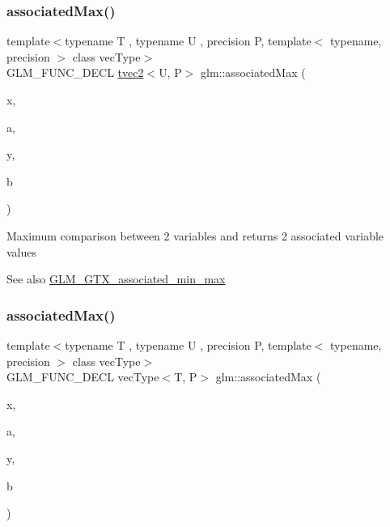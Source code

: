 \subsubsection{\texorpdfstring{associated\+Max()}{associatedMax()}\hspace{0.1cm}{\footnotesize\ttfamily [2/12]}}
{\footnotesize\ttfamily template$<$typename T , typename U , precision P, template$<$ typename, precision $>$ class vec\+Type$>$ \\
G\+L\+M\+\_\+\+F\+U\+N\+C\+\_\+\+D\+E\+CL \hyperlink{structglm_1_1tvec2}{tvec2}$<$U, P$>$ glm\+::associated\+Max (\begin{DoxyParamCaption}\item[{vec\+Type$<$ T, P $>$ const \&}]{x,  }\item[{vec\+Type$<$ U, P $>$ const \&}]{a,  }\item[{vec\+Type$<$ T, P $>$ const \&}]{y,  }\item[{vec\+Type$<$ U, P $>$ const \&}]{b }\end{DoxyParamCaption})}

Maximum comparison between 2 variables and returns 2 associated variable values \begin{DoxySeeAlso}{See also}
\hyperlink{group__gtx__associated__min__max}{G\+L\+M\+\_\+\+G\+T\+X\+\_\+associated\+\_\+min\+\_\+max} 
\end{DoxySeeAlso}
\mbox{\label{group__gtx__associated__min__max_ga62ca63cca6b21387b8a25474f441a869}} 
\subsubsection{\texorpdfstring{associated\+Max()}{associatedMax()}\hspace{0.1cm}{\footnotesize\ttfamily [3/12]}}
{\footnotesize\ttfamily template$<$typename T , typename U , precision P, template$<$ typename, precision $>$ class vec\+Type$>$ \\
G\+L\+M\+\_\+\+F\+U\+N\+C\+\_\+\+D\+E\+CL vec\+Type$<$T, P$>$ glm\+::associated\+Max (\begin{DoxyParamCaption}\item[{T}]{x,  }\item[{vec\+Type$<$ U, P $>$ const \&}]{a,  }\item[{T}]{y,  }\item[{vec\+Type$<$ U, P $>$ const \&}]{b }\end{DoxyParamCaption})}

